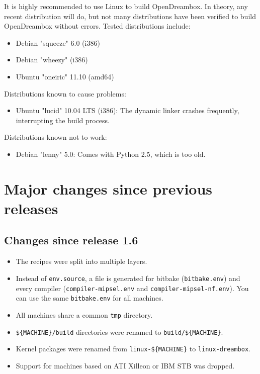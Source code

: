 \documentclass[a4paper]{article}
\newcommand{\shell}[1]{\texttt{\small #1}}
\begin{document}
   It is highly recommended to use Linux to build OpenDreambox. In theory,
   any recent distribution will do, but not many distributions have been
   verified to build OpenDreambox without errors. Tested distributions include:

   \begin{itemize}
     \item Debian "squeeze" 6.0 (i386)
     \item Debian "wheezy" (i386)
     \item Ubuntu "oneiric" 11.10 (amd64)
   \end{itemize}

   Distributions known to cause problems:

   \begin{itemize}
     \item Ubuntu "lucid" 10.04 LTS (i386): The dynamic linker crashes
           frequently, interrupting the build process.
   \end{itemize}

   Distributions known not to work:

   \begin{itemize}
     \item Debian "lenny" 5.0: Comes with Python 2.5, which is too old.
   \end{itemize}

\pagebreak

\section{Major changes since previous releases}

  \subsection{Changes since release 1.6}
    \begin{itemize}
      \item The recipes were split into multiple layers.
      \item Instead of \shell{env.source}, a file is generated for bitbake
        (\shell{bitbake.env}) and every compiler (\shell{compiler-mipsel.env}
        and \shell{compiler-mipsel-nf.env}). You can use the same
        \shell{bitbake.env} for all machines.
      \item All machines share a common \shell{tmp} directory.
      \item \shell{\$\{MACHINE\}/build} directories were renamed to \shell{build/\$\{MACHINE\}}.
      \item Kernel packages were renamed from \shell{linux-\$\{MACHINE\}} to \shell{linux-dreambox}.
      \item Support for machines based on ATI Xilleon or IBM STB was dropped.
    \end{itemize}
\end{document}

